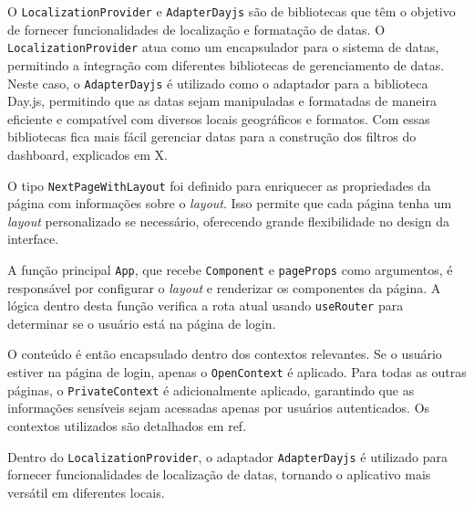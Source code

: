 O \texttt{LocalizationProvider} e \texttt{AdapterDayjs} são de bibliotecas que têm o objetivo de fornecer funcionalidades de localização e formatação de datas. O \texttt{LocalizationProvider} atua como um encapsulador para o sistema de datas, permitindo a integração com diferentes bibliotecas de gerenciamento de datas. Neste caso, o \texttt{AdapterDayjs} é utilizado como o adaptador para a biblioteca Day.js, permitindo que as datas sejam manipuladas e formatadas de maneira eficiente e compatível com diversos locais geográficos e formatos. Com essas bibliotecas fica mais fácil gerenciar datas para a construção dos filtros do dashboard, explicados em X. %

O tipo \texttt{NextPageWithLayout} foi definido para enriquecer as propriedades da página com informações sobre o \textit{layout}. Isso permite que cada página tenha um \textit{layout} personalizado se necessário, oferecendo grande flexibilidade no design da interface.

A função principal \texttt{App}, que recebe \texttt{Component} e \texttt{pageProps} como argumentos, é responsável por configurar o \textit{layout} e renderizar os componentes da página. A lógica dentro desta função verifica a rota atual usando \texttt{useRouter} para determinar se o usuário está na página de login.

O conteúdo é então encapsulado dentro dos contextos relevantes. Se o usuário estiver na página de login, apenas o \texttt{OpenContext} é aplicado. Para todas as outras páginas, o \texttt{PrivateContext} é adicionalmente aplicado, garantindo que as informações sensíveis sejam acessadas apenas por usuários autenticados. Os contextos utilizados são detalhados em ref. %

Dentro do \texttt{LocalizationProvider}, o adaptador \texttt{AdapterDayjs} é utilizado para fornecer funcionalidades de localização de datas, tornando o aplicativo mais versátil em diferentes locais.


